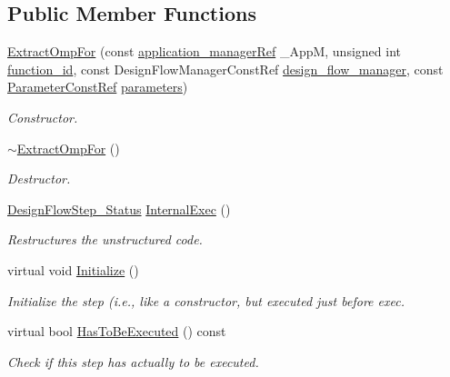 \subsection*{Public Member Functions}
\begin{DoxyCompactItemize}
\item 
\hyperlink{classExtractOmpFor_a3d6aea92a79e5a2cc03a3b6007b0f383}{Extract\+Omp\+For} (const \hyperlink{application__manager_8hpp_a04ccad4e5ee401e8934306672082c180}{application\+\_\+manager\+Ref} \+\_\+\+AppM, unsigned int \hyperlink{classFunctionFrontendFlowStep_a58ef2383ad1a212a8d3f396625a4b616}{function\+\_\+id}, const Design\+Flow\+Manager\+Const\+Ref \hyperlink{classDesignFlowStep_ab770677ddf087613add30024e16a5554}{design\+\_\+flow\+\_\+manager}, const \hyperlink{Parameter_8hpp_a37841774a6fcb479b597fdf8955eb4ea}{Parameter\+Const\+Ref} \hyperlink{classDesignFlowStep_a802eaafe8013df706370679d1a436949}{parameters})
\begin{DoxyCompactList}\small\item\em Constructor. \end{DoxyCompactList}\item 
\hyperlink{classExtractOmpFor_af08077a85296a9e4d6e095f5643beccb}{$\sim$\+Extract\+Omp\+For} ()
\begin{DoxyCompactList}\small\item\em Destructor. \end{DoxyCompactList}\item 
\hyperlink{design__flow__step_8hpp_afb1f0d73069c26076b8d31dbc8ebecdf}{Design\+Flow\+Step\+\_\+\+Status} \hyperlink{classExtractOmpFor_aedb821b92ea3f6554fc10e661377d059}{Internal\+Exec} ()
\begin{DoxyCompactList}\small\item\em Restructures the unstructured code. \end{DoxyCompactList}\item 
virtual void \hyperlink{classExtractOmpFor_aa13852248ade9c2e4518534556213692}{Initialize} ()
\begin{DoxyCompactList}\small\item\em Initialize the step (i.\+e., like a constructor, but executed just before exec. \end{DoxyCompactList}\item 
virtual bool \hyperlink{classExtractOmpFor_ab4577fa78708af18e3d2718869797d38}{Has\+To\+Be\+Executed} () const
\begin{DoxyCompactList}\small\item\em Check if this step has actually to be executed. \end{DoxyCompactList}\end{DoxyCompactItemize}
